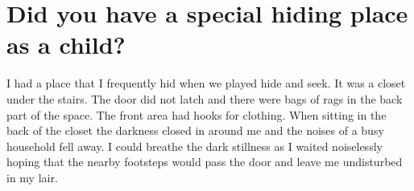 \section{Did you have a special hiding place as a child?}
I had a place that I frequently hid when we played hide and seek.
It was a closet under the stairs.
The door did not latch and there were bags of rags in the back part of the space.
The front area had hooks for clothing.
When sitting in the back of the closet the darkness closed in around me and the noises of a busy household fell away.
I could breathe the dark stillness as I waited noiselessly hoping that the nearby footsteps would pass the door and leave me undisturbed in my lair.
